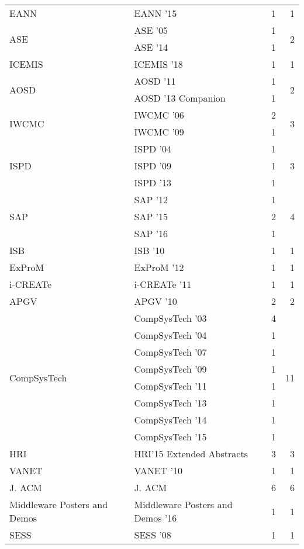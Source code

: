 \begin{table*}[t]
\begin{tabular}{llrr}
\multirow{1}{*}{EANN } & EANN '15 & 1 & \multirow{1}{*}{1}\\
\multirow{2}{*}{ASE } & ASE '05 & 1 & \multirow{2}{*}{2}\\
& ASE '14 & 1 &\\
\multirow{1}{*}{ICEMIS } & ICEMIS '18 & 1 & \multirow{1}{*}{1}\\
\multirow{2}{*}{AOSD } & AOSD '11 & 1 & \multirow{2}{*}{2}\\
& AOSD '13 Companion & 1 &\\
\multirow{2}{*}{IWCMC } & IWCMC '06 & 2 & \multirow{2}{*}{3}\\
& IWCMC '09 & 1 &\\
\multirow{3}{*}{ISPD } & ISPD '04 & 1 & \multirow{3}{*}{3}\\
& ISPD '09 & 1 &\\
& ISPD '13 & 1 &\\
\multirow{3}{*}{SAP } & SAP '12 & 1 & \multirow{3}{*}{4}\\
& SAP '15 & 2 &\\
& SAP '16 & 1 &\\
\multirow{1}{*}{ISB } & ISB '10 & 1 & \multirow{1}{*}{1}\\
\multirow{1}{*}{ExProM } & ExProM '12 & 1 & \multirow{1}{*}{1}\\
\multirow{1}{*}{i-CREATe } & i-CREATe '11 & 1 & \multirow{1}{*}{1}\\
\multirow{1}{*}{APGV } & APGV '10 & 2 & \multirow{1}{*}{2}\\
\multirow{8}{*}{CompSysTech } & CompSysTech '03 & 4 & \multirow{8}{*}{11}\\
& CompSysTech '04 & 1 &\\
& CompSysTech '07 & 1 &\\
& CompSysTech '09 & 1 &\\
& CompSysTech '11 & 1 &\\
& CompSysTech '13 & 1 &\\
& CompSysTech '14 & 1 &\\
& CompSysTech '15 & 1 &\\
\multirow{1}{*}{HRI} & HRI'15 Extended Abstracts & 3 & \multirow{1}{*}{3}\\
\multirow{1}{*}{VANET } & VANET '10 & 1 & \multirow{1}{*}{1}\\
\multirow{1}{*}{J. ACM} & J. ACM & 6 & \multirow{1}{*}{6}\\
\multirow{1}{*}{Middleware Posters and Demos } & Middleware Posters and Demos '16 & 1 & \multirow{1}{*}{1}\\
\multirow{1}{*}{SESS } & SESS '08 & 1 & \multirow{1}{*}{1}\\

\end{tabular}
\end{table*}
